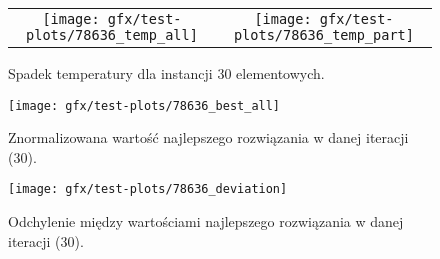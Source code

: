 \begin{figure}[H]
\centering
\begin{table}[H]
\centering
\begin{tabularx}{1\textwidth}{ c c }
\texttt{[image: gfx/test-plots/78636\_temp\_all]} & \texttt{[image: gfx/test-plots/78636\_temp\_part]} \\

\end{tabularx}
\end{table}
\caption{Spadek temperatury dla instancji 30 elementowych.}
\end{figure}
\begin{figure}[H]
\centering
\texttt{[image: gfx/test-plots/78636\_best\_all]}
\caption{Znormalizowana wartość najlepszego rozwiązania w danej iteracji (30).}
\end{figure}
\begin{figure}[H]
\centering
\texttt{[image: gfx/test-plots/78636\_deviation]}
\caption{Odchylenie między wartościami najlepszego rozwiązania w danej iteracji (30).}
\end{figure}


